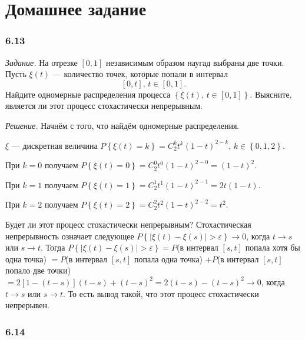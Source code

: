 \section*{Домашнее задание}

\subsubsection*{6.13}

\textit{Задание.}
На отрезке $ \left[ 0, 1 \right] $ независимым образом наугад выбраны две точки.
Пусть $ \xi \left( t \right) $ --- количество точек,
которые попали в интервал
$$ \left[ 0, t \right], \,
  t \in \left[ 0, 1 \right].$$
Найдите одномерные распределения процесса
$ \left\{ \xi \left( t \right), \, t \in \left[ 0, 1 \right] \right\} $.
Выясните, является ли этот процесс стохастически непрерывным.

\textit{Решение.}
Начнём с того, что найдём одномерные распределения.

$ \xi $ --- дискретная величина
$P \left\{ \xi \left( t \right) = k \right\} = C_2^k t^k \left( 1 - t \right)^{2 - k}, \,
  k \in \left\{ 0, 1, 2 \right\} $.

При $k = 0$ получаем
$P \left\{ \xi \left( t \right) = 0 \right\} =
  C_2^0 t^0 \left( 1 - t \right)^{2 - 0} =
  \left( 1 - t \right)^2$.

При $k = 1$ получаем
$P \left\{ \xi \left( t \right) = 1 \right\} =
  C_2^1 t^1 \left( 1 - t \right)^{2 - 1} =
  2t \left( 1 - t \right) $.

При $k = 2$ получаем
$P \left\{ \xi \left( t \right) = 2 \right\} =
  C_2^2 t^2 \left( 1 - t \right)^{2 - 2} =
  t^2$.

Будет ли этот процесс стохастически непрерывным?
Стохастическая непрерывность означает следующее
$P \left\{ \left| \xi \left( t \right) - \xi \left( s \right) \right| > \varepsilon \right\} \to
  0$,
когда $t \to s$ или $s \to t$.
Тогда
$P \left\{ \left| \xi \left( t \right) - \xi \left( s \right) \right| > \varepsilon \right\} =
  P$(в интервал $ \left[ s, t \right] $ попала хотя бы одна точка) $=
  P$(в интервал $ \left[ s, t \right] $ попала одна точка) $+
  P$(в интервал $ \left[ s, t \right] $ попало две точки) $=
  2 \left[ 1 - \left( t - s \right) \right] \left( t - s \right) + \left( t - s \right)^2 =
  2 \left( t - s \right) - \left( t - s \right)^2 \to
  0$,
когда $t \to s$ или $s \to t$.
То есть вывод такой, что этот процесс стохастически непрерывен.

\subsubsection*{6.14}

